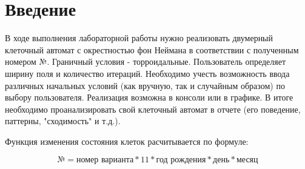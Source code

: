 \section*{Введение}

В ходе выполнения лабораторной работы нужно реализовать двумерный клеточный автомат с окрестностью фон Неймана в соответствии с полученным номером №. Граничный условия - торроидальные. Пользователь определяет ширину поля и количество итераций. Необходимо учесть возможность ввода различных начальных условий (как вручную, так и случайным образом) по выбору пользователя. Реализация возможна в консоли или в графике. В итоге необходимо проанализировать свой клеточный автомат в отчете (его поведение, паттерны, "сходимость" и т.д.). 

Функция изменения состояния клеток расчитывается по формуле:

\[
№ = \text{номер варианта} * 11 * \text{год рождения} * \text{день} * \text{месяц}
\]